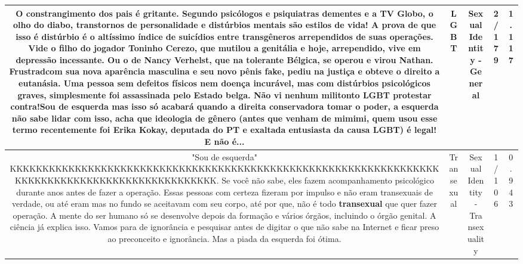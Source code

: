 \documentclass[11pt]{article}
\newlength\mylength
\begin{document}
\begin{center}
\begin{longtable}{|C{.65\mylength}|C{.30\mylength}|C{.12\mylength}|C{.12\mylength}|C{.12\mylength}|}
  \small O constrangimento dos pais é gritante. Segundo psicólogos e psiquiatras dementes e a TV Globo, o olho do diabo, transtornos de personalidade e distúrbios mentais são estilos de vida! A prova de que isso é distúrbio é o altíssimo índice de suicídios entre transgêneros arrependidos de suas operações. Vide o filho do jogador Toninho Cerezo, que mutilou a genitália e hoje, arrependido, vive em depressão incessante. Ou o de Nancy Verhelst, que na tolerante Bélgica, se operou e virou Nathan. Frustrad\@ com sua nova aparência masculina e seu novo pênis fake, pediu na justiça e obteve o direito a eutanásia. Uma pessoa sem defeitos físicos nem doença incurável, mas com distúrbios psicológicos graves, simplesmente foi assassinada pelo Estado belga. Não vi nenhum militonto \textbf{LGBT} protestar contra!Sou de esquerda mas isso só acabará quando a direita conservadora tomar o poder, a esquerda não sabe lidar com isso, acha que ideologia de gênero (antes que venham de mimimi, quem usou esse termo recentemente foi Erika Kokay, deputada do PT e exaltada entusiasta da causa \textbf{LGBT}) é legal! E não é...\normalsize   & LGBT & Sexual Identity - General & 2/179 & 1.117 \\  \hline
  \small "Sou de esquerda" KKKKKKKKKKKKKKKKKKKKKKKKKKKKKKKKKKKKKKKKKKKKKKKKKKKKKKKKKKKKKKKKKKKKKKKKKKKKKKKKKKKKKKKKKKKKKKKKK. Se você não sabe, eles fazem acompanhamento psicológico durante anos antes de fazer a operação. Essas pessoas com certeza fizeram por impulso e não eram transexuais de verdade, ou até eram mas no fundo se aceitavam com seu corpo, até por que, não é todo \textbf{transexual} que quer fazer operação. A mente do ser humano só se desenvolve depois da formação e vários órgãos, incluindo o órgão genital. A ciência já explica isso. Vamos para de ignorância e pesquisar antes de digitar o que não sabe na Internet e ficar preso ao preconceito e ignorância. Mas a piada da esquerda foi ótima.\normalsize   & Transexual & Sexual Identity - Transexuality & 1/106 & 0.943 \\  \hline

\end{longtable}
\end{center}
\end{document}
